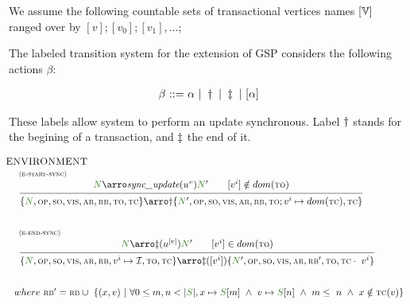 \documentclass[envcountsect,runningheads,orivec]{llncs}
\begin{document}


We assume the following countable sets of transactional vertices names $[\mathbb{V}]$ ranged over by $[v];[v_0];[v_1],\ldots$;

The labeled transition system for the extension of GSP considers the following actions $\beta$:	

\[ 
\begin{array}{r@{\ ::= \ }l}
  \beta & \alpha \ | \ \startsynctran \ | \ \finishsynctran  \ | \  [\alpha] \\
\end{array}
\]

These labels allow system to perform an update synchronous. Label $\dagger$ stands for the begining of a transaction, and $\ddagger$ the end of it.



 \[
 \begin{array}{l}    \hspace{-.3cm} \textsc{ENVIRONMENT}\\

		
\mathrule{e-start-sync}{\systemterm \arroi{\syncupdtran{u}{v}} \systemterm' \qquad [v^i] \notin 
dom(\tx)}{\environmenttran{\systemterm}{\op}{\so}{\vis}{\arb}{\rb}{\tx}{\tc} \arroi{\startsynctran} \environmenttran{\systemterm'}{\op}{\so}{\vis}{\arb}{\rb}{\tx;v^i \mapsto dom(\tc)}{\tc}}

 \\[35pt]

\mathrule{e-end-sync}{\systemterm \arroi{\finishsynctran(u^{[v]})} \systemterm' \qquad [v^i] \in 
dom(\tx)}{\environmenttran{\systemterm}{\op}{\so}{\vis}{\arb}{\rb}{v^i \mapsto \idset,\tx}{\tc} \arroi{\finishsynctran([v^i])} \environmenttran{\systemterm'}{\op}{\so}{\vis}{\arb}{\rb'}{\tx}{\tc \cdot\ v^i}}
\\
 \\[10pt]where \ 
\rb' = \rb \cup\ \{ (x,v) \ | \ \forall 0 \leq m,n < |\queuemessage|, x \mapsto \queuemessage[m] \ \land \ v \mapsto \queuemessage[n] \ \land \ m \leq\ n \ \land \ x\notin\tc(v) \}
 \end{array}
 \]
\end{document}
